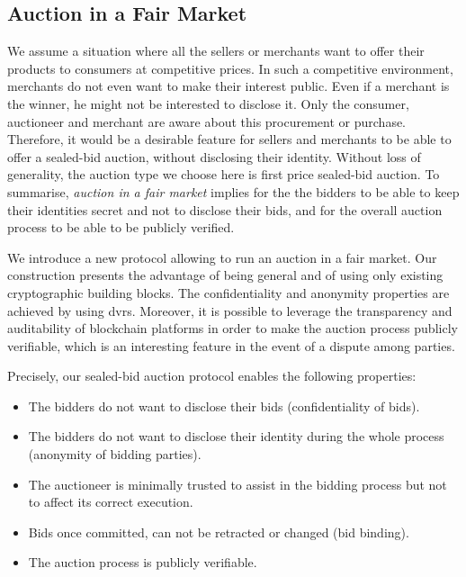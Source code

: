 \subsection{Auction in a Fair Market}
\label{subsec-usecase}
We assume a situation where all the sellers or merchants want to offer
their products to consumers at competitive prices. In such a competitive environment, merchants do not even want to make their interest public. Even if a merchant is the winner, he might not be interested to disclose it. Only the consumer, auctioneer and merchant are aware about this procurement or purchase. Therefore, it would be a desirable feature for sellers and merchants to be able to offer a sealed-bid auction, without disclosing their identity. Without loss of generality, the auction type we choose here is first price sealed-bid auction. To summarise, \textit{auction in a fair market} implies for the the bidders to be able to keep their identities secret and not to disclose their bids, and for the overall auction process to be able to be publicly verified.

  We introduce a new protocol allowing to run an auction in a fair market. Our construction presents the advantage of being general and of using only existing cryptographic building blocks. The confidentiality and anonymity properties are achieved by using \gls{dvrs}. Moreover, it is possible to leverage the transparency and auditability of blockchain platforms in order to make the auction process publicly verifiable, which is an interesting feature in the event of a dispute among parties. 

Precisely, our sealed-bid auction protocol enables the following properties:
\begin{itemize}
\item The bidders do not want to disclose their bids (confidentiality
  of bids).
\item The bidders do not want to disclose their identity during the
  whole process (anonymity of bidding parties).
\item The auctioneer is minimally trusted to assist in the bidding
  process but not to affect its correct execution.
\item Bids once committed, can not be retracted or changed (bid
  binding).
\item The auction process is publicly verifiable.
\end{itemize}

